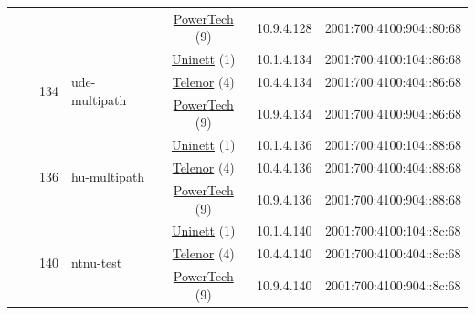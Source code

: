 \begin{small}
\begin{center}
\begin{longtable}{|c|c|c|c|c|c|c|c|}
  &  &  &  & \multicolumn{2}{|c|}{\tiny{\href{http://www.powertech.no}{PowerTech} (9)}} & \tiny{10.9.4.128} & \tiny{2001:700:4100:904::80:68} \\* \cline{3-3}\cline{4-4}\cline{5-5}\cline{6-6}\cline{7-7}\cline{8-8}
  &  & \multirow{3}{*}{\tiny{134}} & \multicolumn{1}{|l|}{\multirow{3}{*}{\tiny{ude-multipath}}} & \multicolumn{2}{|c|}{\tiny{\href{https://www.uninett.no}{Uninett} (1)}} & \tiny{10.1.4.134} & \tiny{2001:700:4100:104::86:68} \\* \cline{5-5}\cline{6-6}\cline{7-7}\cline{8-8}
  &  &  &  & \multicolumn{2}{|c|}{\tiny{\href{https://www.telenor.no}{Telenor} (4)}} & \tiny{10.4.4.134} & \tiny{2001:700:4100:404::86:68} \\* \cline{5-5}\cline{6-6}\cline{7-7}\cline{8-8}
  &  &  &  & \multicolumn{2}{|c|}{\tiny{\href{http://www.powertech.no}{PowerTech} (9)}} & \tiny{10.9.4.134} & \tiny{2001:700:4100:904::86:68} \\* \cline{3-3}\cline{4-4}\cline{5-5}\cline{6-6}\cline{7-7}\cline{8-8}
  &  & \multirow{3}{*}{\tiny{136}} & \multicolumn{1}{|l|}{\multirow{3}{*}{\tiny{hu-multipath}}} & \multicolumn{2}{|c|}{\tiny{\href{https://www.uninett.no}{Uninett} (1)}} & \tiny{10.1.4.136} & \tiny{2001:700:4100:104::88:68} \\* \cline{5-5}\cline{6-6}\cline{7-7}\cline{8-8}
  &  &  &  & \multicolumn{2}{|c|}{\tiny{\href{https://www.telenor.no}{Telenor} (4)}} & \tiny{10.4.4.136} & \tiny{2001:700:4100:404::88:68} \\* \cline{5-5}\cline{6-6}\cline{7-7}\cline{8-8}
  &  &  &  & \multicolumn{2}{|c|}{\tiny{\href{http://www.powertech.no}{PowerTech} (9)}} & \tiny{10.9.4.136} & \tiny{2001:700:4100:904::88:68} \\* \cline{3-3}\cline{4-4}\cline{5-5}\cline{6-6}\cline{7-7}\cline{8-8}
  &  & \multirow{3}{*}{\tiny{140}} & \multicolumn{1}{|l|}{\multirow{3}{*}{\tiny{ntnu-test}}} & \multicolumn{2}{|c|}{\tiny{\href{https://www.uninett.no}{Uninett} (1)}} & \tiny{10.1.4.140} & \tiny{2001:700:4100:104::8c:68} \\* \cline{5-5}\cline{6-6}\cline{7-7}\cline{8-8}
  &  &  &  & \multicolumn{2}{|c|}{\tiny{\href{https://www.telenor.no}{Telenor} (4)}} & \tiny{10.4.4.140} & \tiny{2001:700:4100:404::8c:68} \\* \cline{5-5}\cline{6-6}\cline{7-7}\cline{8-8}
  &  &  &  & \multicolumn{2}{|c|}{\tiny{\href{http://www.powertech.no}{PowerTech} (9)}} & \tiny{10.9.4.140} & \tiny{2001:700:4100:904::8c:68} \\* \cline{3-3}\cline{4-4}\cline{5-5}\cline{6-6}\cline{7-7}\cline{8-8}

\end{longtable}
\end{center}
\end{small}
